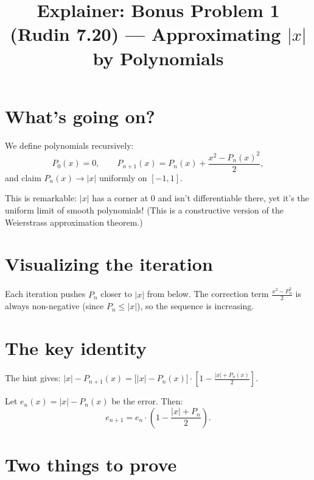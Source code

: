 \documentclass[12pt]{article}
\title{Explainer: Bonus Problem 1 (Rudin 7.20) --- Approximating $|x|$ by Polynomials}
\author{}
\date{}
\begin{document}
\maketitle

\section*{What's going on?}
We define polynomials recursively:
$$
P_0(x) = 0, \qquad P_{n+1}(x) = P_n(x) + \frac{x^2 - P_n(x)^2}{2},
$$
and claim $P_n(x) \to |x|$ uniformly on $[-1,1]$.

This is remarkable: $|x|$ has a corner at $0$ and isn't differentiable there, yet it's the uniform limit of smooth polynomials! (This is a constructive version of the Weierstrass approximation theorem.)

\section*{Visualizing the iteration}

\begin{center}
\end{center}

Each iteration pushes $P_n$ closer to $|x|$ from below. The correction term $\frac{x^2 - P_n^2}{2}$ is always non-negative (since $P_n \leq |x|$), so the sequence is increasing.

\section*{The key identity}

The hint gives: $|x| - P_{n+1}(x) = \bigl[|x| - P_n(x)\bigr] \cdot \left[1 - \frac{|x| + P_n(x)}{2}\right]$.

Let $e_n(x) = |x| - P_n(x)$ be the error. Then:
$$
e_{n+1} = e_n \cdot \left(1 - \frac{|x| + P_n}{2}\right).
$$

\section*{Two things to prove}
\end{document}
